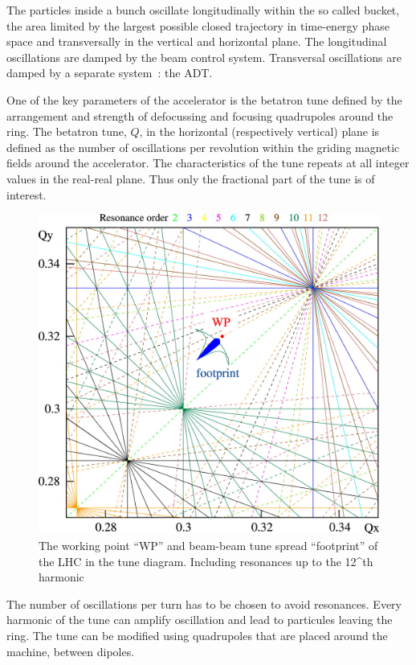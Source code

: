 The particles inside a bunch oscillate longitudinally within the so called bucket, the area limited by the largest possible closed trajectory in time-energy phase space and transversally in the vertical and horizontal plane. The longitudinal oscillations are damped by the beam control system. Transversal oscillations are damped by a separate system~: the \gls{ADT}\cite{Zhabitsky:1141925,Benews11}.

One of the key parameters of the accelerator is the betatron tune defined by the arrangement and strength of defocussing and focusing quadrupoles around the ring. The betatron tune, $Q$, in the horizontal (respectively vertical) plane is defined as the number of oscillations per revolution within the griding magnetic fields around the accelerator. The characteristics of the tune repeats at all integer values in the real-real plane. Thus only the fractional part of the tune is of interest.

\begin{figure}[H]
\centering
\caption{The working point ``WP'' and beam-beam tune spread ``footprint'' of the LHC in the tune diagram. Including resonances up to the 12^{th} harmonic}
\includegraphics[scale=1.25]{lhc_working_point.jpeg}
\end{figure}

The number of oscillations per turn has to be chosen to avoid resonances. Every harmonic of the tune can amplify oscillation and lead to particules leaving the ring. The tune can be modified using quadrupoles that are placed around the machine, between dipoles.

